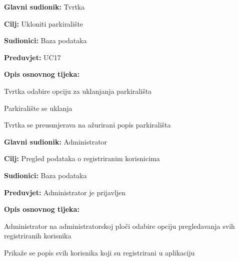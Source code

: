 \noindent {}
\begin{packed_item}
	
	\item \textbf{Glavni sudionik:} Tvrtka
	\item \textbf{Cilj:} Ukloniti parkiralište
	\item \textbf{Sudionici:} Baza podataka
	\item \textbf{Preduvjet:} UC17
	\item \textbf{Opis osnovnog tijeka:}
	
	\item[] \begin{packed_enum}
		
		\item Tvrtka odabire opciju za uklanjanja parkirališta
		\item Parkiralište se uklanja
		\item Tvrtka se preusmjerava na ažurirani popis parkirališta

	\end{packed_enum}
\end{packed_item}

\pagebreak

\noindent {}
\begin{packed_item}
	
	\item \textbf{Glavni sudionik:} Administrator
	\item  \textbf{Cilj:} Pregled podataka o registriranim korisnicima
	\item  \textbf{Sudionici:} Baza podataka
	\item  \textbf{Preduvjet:} Administrator je prijavljen
	\item  \textbf{Opis osnovnog tijeka:}
	
	\item[] \begin{packed_enum}
		
		\item Administrator na administratorskoj ploči odabire opciju pregledavanja svih registriranih korisnika 
		\item Prikaže se popis svih korisnika koji su registrirani u aplikaciju
	\end{packed_enum}
\end{packed_item}




